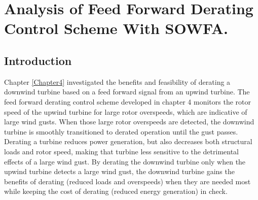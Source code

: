 
\chapter{Analysis of Feed Forward Derating Control Scheme With SOWFA.} %

\label{Chapter6} %



\section{Introduction} \label{section6-1}

Chapter \ref{Chapter4} investigated the benefits and feasibility of derating a downwind turbine based on a feed forward signal from an upwind turbine. The feed forward derating control scheme developed in chapter 4 monitors the rotor speed of the upwind turbine for large rotor overspeeds, which are indicative of large wind gusts. When those large rotor overspeeds are detected, the downwind turbine is smoothly transitioned to derated operation until the gust passes. Derating a turbine reduces power generation, but also decreases both structural loads and rotor speed, making that turbine less sensitive to the detrimental effects of a large wind gust. By derating the downwind turbine only when the upwind turbine detects a large wind gust, the downwind turbine gains the benefits of derating (reduced loads and overspeeds) when they are needed most while keeping the cost of derating (reduced energy generation) in check.

